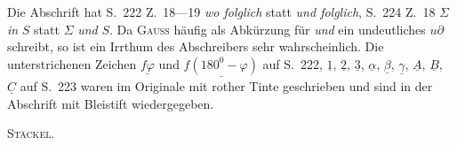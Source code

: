Die Abschrift hat S.~222 Z.~18—19 \emph{wo folglich} statt \emph{und folglich}, S.~224 Z.~18 $\Sigma$ \emph{in} $S$ statt $\Sigma$ \emph{und} $S$. Da \textsc{Gauss} häufig als Abkürzung für \emph{und} ein undeutliches $u\partial$ schreibt, so ist ein Irrthum des Abschreibers sehr wahrscheinlich. Die unterstrichenen Zeichen $\underline{f\varphi}$ und $\underline{f(180^{0}-\varphi)}$ auf S.~222, $\underline{1}$, $\underline{2}$, $\underline{3}$, $\underline{\alpha}$, $\underline{\beta}$, $\underline{\gamma}$, $\underline{A}$, $\underline{B}$, $\underline{C}$ auf S.~223 waren im Originale mit rother Tinte geschrieben und sind in der Abschrift mit Bleistift wiedergegeben.
\begin{flushright}\textsc{Stäckel.}\end{flushright}
\par\endgroup
